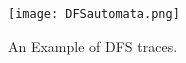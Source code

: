 \begin{figure}[h]
	\graphicspath{{pic/}}
	\begin{center}
		\texttt{[image: DFSautomata.png]}
	\end{center}
	\caption{An Example of DFS traces. }
	\label{DFSautomata}
\end{figure}

\clearpage

